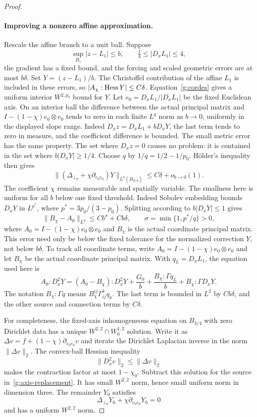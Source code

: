 \begin{proof}
\paragraph{Improving a nonzero affine approximation.}
Rescale the affine branch to a unit ball.  Suppose
\[
 \sup_{B_1}|z-L_1|\leq b,\qquad
 \tfrac14\leq|D_xL_1|\leq4,
\]
the gradient has a fixed bound, and the forcing and scaled geometric
errors are at most $b\delta$.  Set $Y=(z-L_1)/b$.  The Christoffel
contribution of the affine $L_1$ is included in these errors, so
$|A_\chi:\operatorname{Hess} Y|\leq C\delta$.  Equation~\eqref{g:cordes} gives a
uniform interior $W^{2,p_0}$ bound for $Y$.  Let
$e_0=D_xL_1/|D_xL_1|$ be the fixed Euclidean axis.  On an interior ball
the difference between the actual principal matrix and
$I-(1-\chi)e_0\otimes e_0$ tends to zero in each finite $L^q$ norm as
$b\to0$, uniformly in the displayed slope range.  Indeed
$D_xz=D_xL_1+bD_xY$, the last term tends to zero in measure, and the
coefficient difference is bounded.  The small metric error has the same
property.  The set where $D_xz=0$ causes no problem: it is contained in
the set where $b|D_xY|\geq1/4$.
Choose $q$ by $1/q=1/2-1/p_0$.  H\"older's inequality then gives
\begin{equation}\label{g:axis-replacement}
 \| (\Delta_{\perp_0}+\chi\partial_{e_0e_0})Y\|_{L^2(B_{3/4})}
                 \leq C\delta+o_{b\to0}(1).
\end{equation}
The coefficient $\chi$ remains measurable and spatially variable.
The smallness here is uniform for all $b$ below one fixed threshold.
Indeed Sobolev embedding bounds $D_xY$ in
$L^{p^*}$, where $p^*=3p_0/(3-p_0)$.  Splitting according to
$b|D_xY|\leq1$ gives
\[
 \|B_\chi-A_0\|_{L^q}
       \leq Cb^\sigma+Cb\delta,\qquad
 \sigma=\min\{1,p^*/q\}>0,
\]
where $A_0=I-(1-\chi)e_0\otimes e_0$ and $B_\chi$ is the actual
coordinate principal matrix.  This error need only be below the fixed
tolerance for the normalized correction $Y$, not below $b\delta$.
To track all coordinate terms, write $A_0=I-(1-\chi)e_0\otimes e_0$
and let $B_\chi$ be the actual coordinate principal matrix.  With
$q_L=D_xL_1$, the equation used here is
\[
 A_0:D_x^2Y=(A_0-B_\chi):D_x^2Y
       +\frac{G_0}{b}+\frac{B_\chi:\Gamma q_L}{b}
       +B_\chi:\Gamma D_xY.
\]
The notation $B_\chi:\Gamma q$ means
$B_\chi^{ij}\Gamma_{ij}^{k}q_k$.  The last term is bounded in $L^2$
by $Cb\delta$, and the other source and connection terms by $C\delta$.

For completeness, the fixed-axis inhomogeneous equation on $B_{3/4}$
with zero Dirichlet data has a unique $W^{2,2}\cap W^{1,2}_0$ solution.
Write it as
$\Delta v=f+(1-\chi)\partial_{e_0e_0}v$ and iterate the Dirichlet
Laplacian inverse in the norm $\|\Delta v\|_2$.  The convex-ball Hessian
inequality
\[
 \|D_x^2v\|_2\leq\|\Delta v\|_2
\]
makes the contraction factor at most $1-\chi_0$.  Subtract this solution
for the source in~\eqref{g:axis-replacement}.  It has small $W^{2,2}$
norm, hence small uniform norm in dimension three.  The remainder $Y_0$
satisfies
\begin{equation}\label{g:fixed-axis}
 \Delta_{\perp_0}Y_0+\chi\partial_{e_0e_0}Y_0=0
\end{equation}
and has a uniform $W^{2,2}$ norm.


\end{proof}
